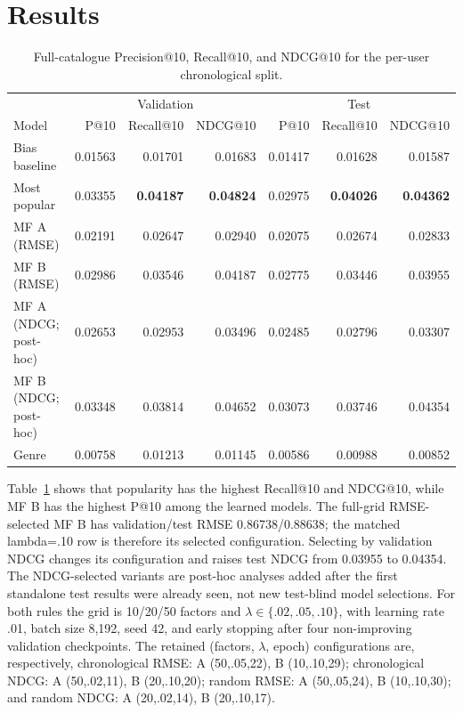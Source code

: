 \documentclass{article}
\begin{document}
\section{Results}
\begin{table}[t]
\centering
\caption{Full-catalogue Precision@10, Recall@10, and NDCG@10 for the
per-user chronological split.}
\label{tab:val}
\small
\begin{tabular}{lrrrrrr}
\toprule
& \multicolumn{3}{c}{Validation} & \multicolumn{3}{c}{Test}\\
Model & P@10 & Recall@10 & NDCG@10 & P@10 & Recall@10 & NDCG@10\\
\midrule
Bias baseline & 0.01563 & 0.01701 & 0.01683 & 0.01417 & 0.01628 & 0.01587\\
Most popular & 0.03355 & \textbf{0.04187} & \textbf{0.04824} & 0.02975 & \textbf{0.04026} & \textbf{0.04362}\\
MF A (RMSE) & 0.02191 & 0.02647 & 0.02940 & 0.02075 & 0.02674 & 0.02833\\
MF B (RMSE) & 0.02986 & 0.03546 & 0.04187
& 0.02775 & 0.03446 & 0.03955\\
MF A (NDCG; post-hoc) & 0.02653 & 0.02953 & 0.03496 & 0.02485 & 0.02796 & 0.03307\\
MF B (NDCG; post-hoc) & 0.03348 & 0.03814 & 0.04652 & 0.03073 & 0.03746 & 0.04354\\
Genre & 0.00758 & 0.01213 & 0.01145 & 0.00586 & 0.00988 & 0.00852\\
\bottomrule
\end{tabular}
\end{table}

Table~\ref{tab:val} shows that popularity has the highest Recall@10 and
NDCG@10, while MF B has the highest P@10 among the learned models. The
full-grid RMSE-selected MF B has validation/test RMSE 0.86738/0.88638; the
matched lambda=.10 row is therefore its selected configuration. Selecting by
validation NDCG changes its configuration and raises test NDCG from 0.03955
to 0.04354. The NDCG-selected variants are post-hoc analyses
added after the first standalone test results were already seen, not new
test-blind model selections.
For both rules the grid is 10/20/50 factors and
$\lambda\in\{.02,.05,.10\}$, with learning rate .01, batch size 8,192,
seed 42, and early stopping after four non-improving validation checkpoints.
The retained (factors, $\lambda$, epoch) configurations are, respectively,
chronological RMSE: A (50,.05,22), B (10,.10,29); chronological NDCG:
A (50,.02,11), B (20,.10,20); random RMSE: A (50,.05,24), B (10,.10,30);
and random NDCG: A (20,.02,14), B (20,.10,17).
\end{document}

